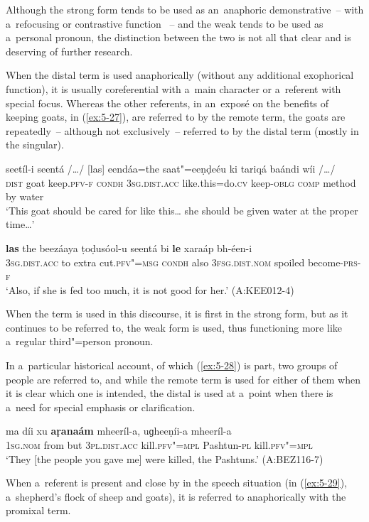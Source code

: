 Although the strong form tends to be used as an~anaphoric demonstrative~-- with a~refocusing or contrastive function \citep[432]{diessel2006}~-- and the weak tends to be used as a~personal pronoun, the distinction between the two is not all that clear and is deserving of further research.

When the distal term is used anaphorically (without any additional exophorical function), it is usually coreferential with a~main character or a~referent with special focus. Whereas the other referents, in an~exposé on the benefits of keeping goats, in (\ref{ex:5-27}), are referred to by the remote term, the goats are repeatedly~-- although not exclusively~-- referred to by the distal term (mostly in the singular). 

\begin{exe}
\ex
\label{ex:5-27}
 seetíl-i seentá /{\ldots}/ [las] eendáa=the saat"=eeṇḍeéu ki
tariqá baándi wíi /{\ldots}/ \\
\textsc{dist} goat keep.\textsc{pfv-f} \textsc{condh} {} \textsc{3sg.dist.acc} like.this=do.\textsc{cv} keep-\textsc{oblg} \textsc{comp} method by water\\
\glt `This goat should be cared for like this{\ldots} she should be given water at the proper time{\ldots}'

\gll \textbf{las} the beezáaya ṭoḍusóol-u seentá bi \textbf{le} xaraáp bh-éen-i \\
\textsc{3sg}.\textsc{dist.acc} to extra cut.\textsc{pfv"=msg} \textsc{condh} also
\textsc{3fsg}.\textsc{dist.nom} spoiled become-\textsc{prs-f} \\
\glt `Also, if she is fed too much, it is not good for her.' (A:KEE012-4)
\end{exe}
When the term is used in this discourse, it is first in the strong form, but as it continues to be referred to, the weak form is used, thus functioning more like a~regular third"=person pronoun.

In a~particular historical account, of which (\ref{ex:5-28}) is part, two groups of people are referred to, and while the remote term is used for either of them when it is clear which one is intended, the distal is used at a~point when there is a~need for special emphasis or clarification.

\begin{exe}
\ex
\label{ex:5-28}
\gll ma díi xu \textbf{aṛanaám} mheeríl-a, uɡheeṇíi-a mheeríl-a\\
\textsc{1sg}.\textsc{nom} from but \textsc{3pl.}\textsc{dist.acc} kill.\textsc{pfv"=mpl} Pashtun-\textsc{pl} kill.\textsc{pfv"=mpl}\\
\glt `They [the people you gave me] were killed, the Pashtuns.' (A:BEZ116-7)\\
\end{exe}
When a~referent is present and close by in the speech situation (in (\ref{ex:5-29}), a~shepherd's flock of sheep and goats), it is referred to anaphorically with the promixal term.


